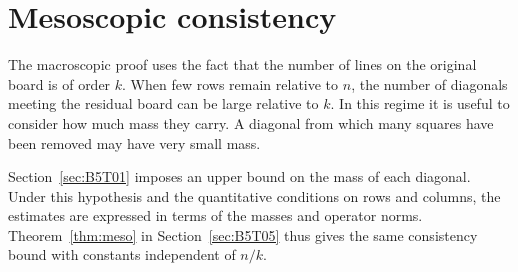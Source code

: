 \section{Mesoscopic consistency}\label{sec:meso}

The macroscopic proof uses the fact that the number of lines on the original board is of order $k$.
When few rows remain relative to $n$, the number of diagonals meeting the residual board
can be large relative to $k$. In this regime it is useful to consider how much mass they carry.
A diagonal from which many squares have been removed may have very small mass.

Section~\ref{sec:B5T01} imposes an upper bound on the mass of each diagonal. Under this hypothesis
and the quantitative conditions on rows and columns, the estimates are expressed in terms of
the masses and operator norms. Theorem~\ref{thm:meso} in
Section~\ref{sec:B5T05} thus gives the same consistency bound with constants
independent of $n/k$.
